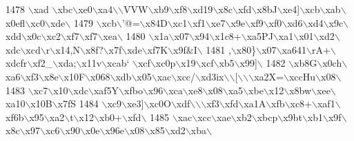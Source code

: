 \begin{DoxyCode}
{1478 \textcolor{stringliteral}{\(\backslash\)xad \(\backslash\)xbc\(\backslash\)xe0\(\backslash\)xa4\(\backslash\)\(\backslash\)VVW\(\backslash\)xb9\(\backslash\)xf8\(\backslash\)xd19\(\backslash\)x8c\(\backslash\)xfd\(\backslash\)x8bJ\(\backslash\)xe4]\(\backslash\)xcb\(\backslash\)xab\(\backslash\)x0efl\(\backslash\)xc0\(\backslash\)xde\(\backslash\)}
1479 \textcolor{stringliteral}{\(\backslash\)xcb\(\backslash\)'@=\(\backslash\)x84D\(\backslash\)xc1\(\backslash\)xf1\(\backslash\)xe7\(\backslash\)x9e\(\backslash\)xf9\(\backslash\)xf0\(\backslash\)xd6\(\backslash\)xd4\(\backslash\)x9c\(\backslash\)xdd\(\backslash\)x0c\(\backslash\)xc2\(\backslash\)xf7\(\backslash\)xf7\(\backslash\)xea\(\backslash\)}
1480 \textcolor{stringliteral}{\(\backslash\)x1a\(\backslash\)x07\(\backslash\)x94\(\backslash\)x1c8+\(\backslash\)xa5PJ\(\backslash\)xa1\(\backslash\)x01\(\backslash\)xd2\(\backslash\)xdc\(\backslash\)xcd\(\backslash\)r\(\backslash\)x14,N\(\backslash\)x8f?\(\backslash\)x7f\(\backslash\)xde\(\backslash\)xf7K\(\backslash\)x9f&I\(\backslash\)}
1481 \textcolor{stringliteral}{,\(\backslash\)x80\}\(\backslash\)x07\(\backslash\)xa641\(\backslash\)rA+\(\backslash\)xdcfr\(\backslash\)xf2\_\(\backslash\)xda;\(\backslash\)x11v\(\backslash\)xcab` \(\backslash\)xcf\(\backslash\)xc0p\(\backslash\)x19\(\backslash\)xcf\(\backslash\)xb5\(\backslash\)x99]\(\backslash\)}
1482 \textcolor{stringliteral}{\(\backslash\)xb8G\(\backslash\)x0ch\(\backslash\)xa6\(\backslash\)xf3\(\backslash\)x8e\(\backslash\)x10F\(\backslash\)x068\(\backslash\)xdb\(\backslash\)x05\(\backslash\)xac\(\backslash\)xcc/\(\backslash\)xd3ix\(\backslash\)\(\backslash\)[\(\backslash\)\(\backslash\)\(\backslash\)xa2X=\(\backslash\)xccHu\(\backslash\)x08\(\backslash\)}
1483 \textcolor{stringliteral}{\(\backslash\)xc7\(\backslash\)x10\(\backslash\)xdc\(\backslash\)xaf5Y\(\backslash\)xfbo\(\backslash\)x96\(\backslash\)xca\(\backslash\)xe8\(\backslash\)x08\(\backslash\)xa5\(\backslash\)xbe\(\backslash\)x12\(\backslash\)x8bw\(\backslash\)xee\(\backslash\)xa10\(\backslash\)x10B\(\backslash\)x7fS%
1484 \textcolor{stringliteral}{\(\backslash\)xc9\(\backslash\)xe3]\(\backslash\)xc0O\(\backslash\)xdf\(\backslash\)\(\backslash\)\(\backslash\)xf3\(\backslash\)xfd\(\backslash\)xa1A\(\backslash\)xfb\(\backslash\)xc8+\(\backslash\)xaf1\(\backslash\)xf6b\(\backslash\)x95\(\backslash\)xa2\(\backslash\)t\(\backslash\)x12\(\backslash\)xb0+\(\backslash\)xfd\(\backslash\)}
1485 \textcolor{stringliteral}{\(\backslash\)xac\(\backslash\)xcc\(\backslash\)xae\(\backslash\)xb2\(\backslash\)xbcp\(\backslash\)x9bt\(\backslash\)xb1\(\backslash\)x9f\(\backslash\)x8c\(\backslash\)x97\(\backslash\)xc6\(\backslash\)x90\(\backslash\)x0e\(\backslash\)x96e\(\backslash\)x08\(\backslash\)x85\(\backslash\)xd2\(\backslash\)xba\(\backslash\)}
}}
\end{DoxyCode}
